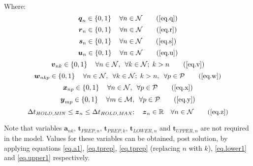 Where:
\begin{equation}
    \boldsymbol{q}_{n} \in \left\{0, 1\right\} \quad \forall n \in \mathcal{N}
    \tag{\ref{eq.q}}
\end{equation}
\begin{equation}
    \boldsymbol{r}_{n} \in \left\{ 0, 1 \right\} \quad \forall n \in
    \mathcal{N}
    \tag{\ref{eq.r}}
\end{equation}
\begin{equation}
    \boldsymbol{s}_{n} \in \left\{ 0, 1 \right\} \quad \forall n \in
    \mathcal{N}
    \tag{\ref{eq.s}}
\end{equation} 
\begin{equation}
    \boldsymbol{u}_{n} \in \left\{ 0, 1 \right\} \quad \forall n \in
    \mathcal{N}
    \tag{\ref{eq.u}}
\end{equation}
\begin{equation}
    \boldsymbol{v}_{nk} \in \left\{ 0, 1 \right\} \quad \forall n \in
    \mathcal{N}, \enspace \forall k \in \mathcal{N}; \; k > n
    \tag{\ref{eq.v}}
\end{equation}
\begin{equation}
    \boldsymbol{w}_{nkp} \in \left\{ 0, 1 \right\} \quad \forall n \in
    \mathcal{N}, \enspace \forall k \in \mathcal{N}; \; k > n, \enspace \forall
    p \in \mathcal{P}
    \tag{\ref{eq.w}}
\end{equation}
\begin{equation}
    \boldsymbol{x}_{np} \in \left\{ 0, 1 \right\} \quad \forall n \in
    \mathcal{N}, \enspace \forall p \in \mathcal{P}
    \tag{\ref{eq.x}}
\end{equation}
\begin{equation}
    \boldsymbol{y}_{mp} \in \left\{ 0, 1 \right\} \quad \forall m \in
    \mathcal{M}, \enspace \forall p \in \mathcal{P}
    \tag{\ref{eq.y}}
\end{equation}
\begin{equation}
    \Delta t_{\mathit{HOLD,MIN}} \le \boldsymbol{z}_{n} \le 
    \Delta t_{\mathit{HOLD,MAX}}; \quad
    \boldsymbol{z}_{n} \in \mathbb{R} \quad \forall n \in \mathcal{N}
    \tag{\ref{eq.z}}
\end{equation}

Note that variables $\boldsymbol{a}_{nk}$, $\boldsymbol{t}_{\mathit{PREP},n}$,
$\boldsymbol{t}_{\mathit{PREP},k}$, $\boldsymbol{t}_{\mathit{LOWER},n}$ and
$\boldsymbol{t}_{\mathit{UPPER},n}$ are not required in the model. Values for
these variables can be obtained, post solution, by applying equations
\ref{eq.a1}, \ref{eq.tprep}, \ref{eq.tprep} (replacing $n$ with $k$),
\ref{eq.lower1} and \ref{eq.upper1} respectively.


